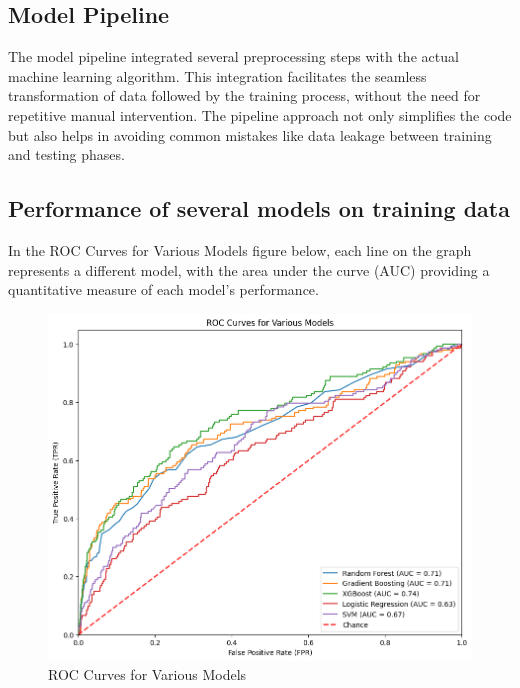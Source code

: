 \documentclass{article}
\begin{document}
\subsection{Model Pipeline}
The model pipeline integrated several preprocessing steps with the actual machine learning algorithm. This integration facilitates the seamless transformation of data followed by the training process, without the need for repetitive manual intervention. The pipeline approach not only simplifies the code but also helps in avoiding common mistakes like data leakage between training and testing phases.

\subsection{Performance of several models on training data}

In the ROC Curves for Various Models figure below, each line on the graph represents a different model, with the area under the curve (AUC) providing a quantitative measure of each model's performance.


\begin{figure}[h]
\centering
\includegraphics[width=0.5\linewidth]{models.png}
\caption{ROC Curves for Various Models}
\label{fig:distribution}
\end{figure}
\end{document}
